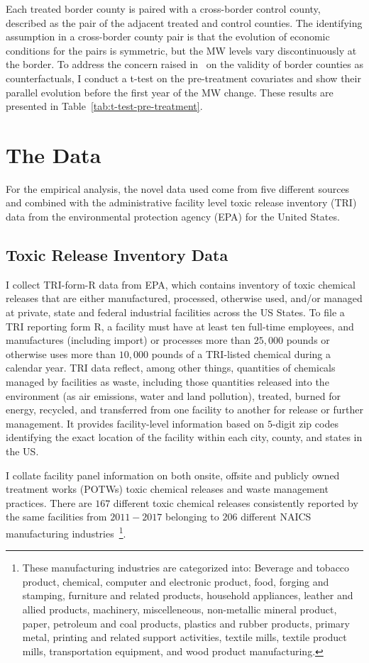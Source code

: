 \documentclass[12pt, english]{article}
\begin{document}
    
    
    Each treated border county is paired with a cross-border control county, described as the pair of the adjacent treated and control counties. The identifying assumption in a cross-border county pair is that the evolution of economic conditions for the pairs is symmetric, but the MW levels vary discontinuously at the border. To address the concern raised in~\cite{neumark2014revisiting} on the validity of border counties as counterfactuals, I conduct a t-test on the pre-treatment covariates and show their parallel evolution before the first year of the MW change. These results are presented in Table~\ref{tab:t-test-pre-treatment}.


    \section{The Data}\label{sec:data}
    For the empirical analysis, the novel data used come from five different sources and combined with the administrative facility level toxic release inventory (TRI) data from the environmental protection agency (EPA) for the United States.

    \subsection{Toxic Release Inventory Data}\label{subsec:toxic-release-inventory-data}
    I collect TRI-form-R data from EPA, which contains inventory of toxic chemical releases that are either manufactured, processed, otherwise used, and/or managed at private, state and federal industrial facilities across the US States. To file a TRI reporting form R, a facility must have at least ten full-time employees, and manufactures (including import) or processes more than $25,000$ pounds or otherwise uses more than $10,000$ pounds of a TRI-listed chemical during a calendar year. TRI data reflect, among other things, quantities of chemicals managed by facilities as waste, including those quantities released into the environment (as air emissions, water and land pollution), treated, burned for energy, recycled, and transferred from one facility to another for release or further management. It provides facility-level information based on $5$-digit zip codes identifying the exact location of the facility within each city, county, and states in the US.

    I collate facility panel information on both onsite, offsite and publicly owned treatment works (POTWs) toxic chemical releases and waste management practices. There are $167$ different toxic chemical releases consistently reported by the same facilities from $2011-2017$ belonging to $206$ different NAICS manufacturing industries~\footnote{\tiny These manufacturing industries are categorized into: Beverage and tobacco product, chemical, computer and electronic product, food, forging and stamping, furniture and related products, household appliances, leather and allied products, machinery, miscelleneous, non-metallic mineral product, paper, petroleum and coal products, plastics and rubber products, primary metal, printing and related support activities, textile mills, textile product mills, transportation equipment, and wood product manufacturing.}.
\end{document}
